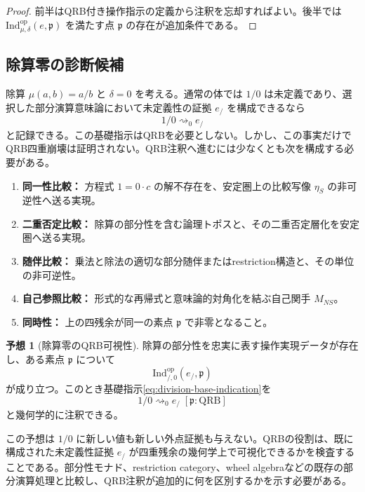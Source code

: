 \documentclass[a4paper,11pt]{ltjsarticle}
\theoremstyle{definition}
\newtheorem{conjecture}[definition]{予想}
\theoremstyle{plain}
\newcommand{\QRB}{\mathrm{QRB}}
\newcommand{\Ind}{\mathrm{Ind}}
\begin{document}
\begin{proof}
前半はQRB付き操作指示の定義から注釈を忘却すればよい。後半では $\Ind^{\mathrm{op}}_{\mu,\delta}(e,\mathfrak p)$ を満たす点 $\mathfrak p$ の存在が追加条件である。
\end{proof}

\subsection{除算零の診断候補}

除算 $\mu(a,b)=a/b$ と $\delta=0$ を考える。通常の体では $1/0$ は未定義であり、選択した部分演算意味論において未定義性の証拠 $e_{/}$ を構成できるなら
\begin{equation}
 1/0\rightsquigarrow_0 e_{/}
 \label{eq:division-base-indication}
\end{equation}
と記録できる。この基礎指示はQRBを必要としない。しかし、この事実だけでQRB四重崩壊は証明されない。QRB注釈へ進むには少なくとも次を構成する必要がある。

\begin{enumerate}
 \item \textbf{同一性比較：} 方程式 $1=0\cdot c$ の解不存在を、安定圏上の比較写像 $\eta_S$ の非可逆性へ送る実現。
 \item \textbf{二重否定比較：} 除算の部分性を含む論理トポスと、その二重否定層化を安定圏へ送る実現。
 \item \textbf{随伴比較：} 乗法と除法の適切な部分随伴またはrestriction構造と、その単位の非可逆性。
 \item \textbf{自己参照比較：} 形式的な再帰式と意味論的対角化を結ぶ自己関手 $M_{NS}$。
 \item \textbf{同時性：} 上の四残余が同一の素点 $\mathfrak p$ で非零となること。
\end{enumerate}

\begin{conjecture}[除算零のQRB可視性]
除算の部分性を忠実に表す操作実現データが存在し、ある素点 $\mathfrak p$ について
\begin{equation}
 \Ind^{\mathrm{op}}_{/,0}(e_{/},\mathfrak p)
\end{equation}
が成り立つ。このとき基礎指示\eqref{eq:division-base-indication}を
\begin{equation}
 1/0\rightsquigarrow_0 e_{/}
 \;[\mathfrak p:\QRB]
\end{equation}
と幾何学的に注釈できる。
\end{conjecture}

この予想は $1/0$ に新しい値も新しい外点証拠も与えない。QRBの役割は、既に構成された未定義性証拠 $e_{/}$ が四重残余の幾何学上で可視化できるかを検査することである。部分性モナド、restriction category、wheel algebraなどの既存の部分演算処理と比較し、QRB注釈が追加的に何を区別するかを示す必要がある。
\end{document}
